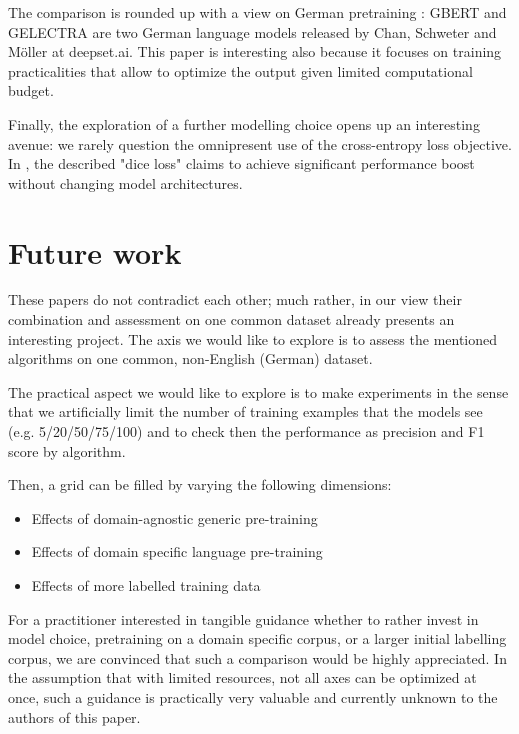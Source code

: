 \documentclass[11pt]{article}
\begin{document}
The comparison is rounded up with a view on German pretraining \citet{Chan-2020}: GBERT and GELECTRA are two German language models released by Chan, Schweter and Möller at deepset.ai. This paper is interesting also because it focuses on training practicalities that allow to optimize the output given limited computational budget. 

Finally, the exploration of a further modelling choice opens up an interesting avenue: we rarely question the omnipresent use of the cross-entropy loss objective. In \citet{li-etal-2020-dice}, the described "dice loss" claims to achieve significant performance boost without changing model architectures. 

\section{Future work}

These papers do not contradict each other; much rather, in our view their combination and assessment on one common dataset already presents an interesting project. The axis we would like to explore is to assess the mentioned algorithms on one common, non-English (German) dataset. 

The practical aspect we would like to explore is to make experiments in the sense that we artificially limit the number of training examples that the models see (e.g. 5/20/50/75/100) and to check then the performance as precision and F1 score by algorithm. 

Then, a grid can be filled by varying the following dimensions:
\begin{itemize}
    \item Effects of domain-agnostic generic pre-training
    \item Effects of domain specific language pre-training
    \item Effects of more labelled training data
\end{itemize}

For a practitioner interested in tangible guidance whether to rather invest in model choice, pretraining on a domain specific corpus, or a larger initial labelling corpus, we are convinced that such a comparison would be highly appreciated. In the assumption that with limited resources, not all axes can be optimized at once, such a guidance is practically very valuable and currently unknown to the authors of this paper. 



\end{document}
